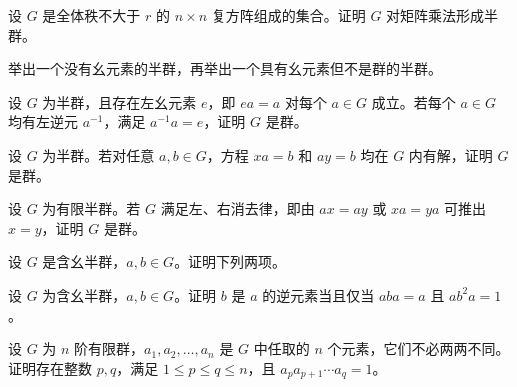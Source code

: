\newpage
\noindent\begin{minipage}{\textwidth}
设 $G$ 是全体秩不大于 $r$ 的 $n\times n$ 复方阵组成的集合。证明 $G$ 对矩阵乘法形成半群。
\end{minipage}\par\vfill
\noindent\begin{minipage}{\textwidth}
举出一个没有幺元素的半群，再举出一个具有幺元素但不是群的半群。
\end{minipage}\par\vfill
\noindent\begin{minipage}{\textwidth}
设 $G$ 为半群，且存在左幺元素 $e$，即 $ea=a$ 对每个 $a\in G$ 成立。若每个 $a\in G$ 均有左逆元 $a^{-1}$，满足 $a^{-1}a=e$，证明 $G$ 是群。
\end{minipage}\par\vfill
\newpage
\noindent\begin{minipage}{\textwidth}
设 $G$ 为半群。若对任意 $a,b\in G$，方程 $xa=b$ 和 $ay=b$ 均在 $G$ 内有解，证明 $G$ 是群。
\end{minipage}\par\vfill
\noindent\begin{minipage}{\textwidth}
设 $G$ 为有限半群。若 $G$ 满足左、右消去律，即由 $ax=ay$ 或 $xa=ya$ 可推出 $x=y$，证明 $G$ 是群。
\end{minipage}\par\vfill
\noindent\begin{minipage}{\textwidth}
设 $G$ 是含幺半群，$a,b\in G$。证明下列两项。
\end{minipage}\par\vfill
\newpage
\noindent\begin{minipage}{\textwidth}
设 $G$ 为含幺半群，$a,b\in G$。证明 $b$ 是 $a$ 的逆元素当且仅当 $aba=a$ 且 $ab^{2}a=1$。
\end{minipage}\par\vfill
\noindent\begin{minipage}{\textwidth}
设 $G$ 为 $n$ 阶有限群，$a_1,a_2,\ldots,a_n$ 是 $G$ 中任取的 $n$ 个元素，它们不必两两不同。证明存在整数 $p,q$，满足 $1\leq p\leq q\leq n$，且 $a_p a_{p+1}\cdots a_q=1$。
\end{minipage}\par\vfill
